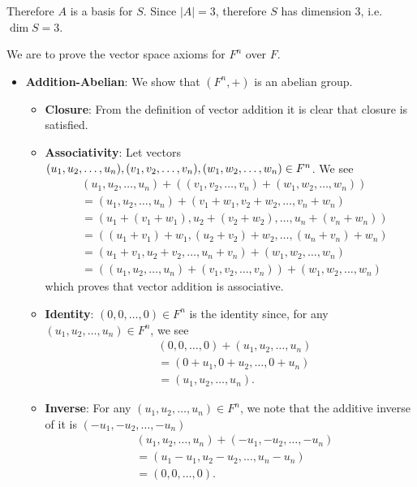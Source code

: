 \begin{questions}
\begin{partquestions}{\alph*}
        Therefore $A$ is a basis for $S$. Since $|A| = 3$, therefore $S$ has dimension 3, i.e. $\dim{S} = 3$.
    \end{partquestions}

    \item We are to prove the vector space axioms for $F^n$ over $F$.
    \begin{itemize}
        \item \textbf{Addition-Abelian}: We show that $(F^n, +)$ is an abelian group.
        \begin{itemize}
            \item \textbf{Closure}: From the definition of vector addition it is clear that closure is satisfied.

            \item \textbf{Associativity}: Let vectors $(u_1, u_2, \dots, u_n), (v_1, v_2, \dots, v_n), \linebreak (w_1, w_2, \dots, w_n) \in F^n$. We see
            \begin{align*}
                &(u_1, u_2, \dots, u_n) + ((v_1, v_2, \dots, v_n) + (w_1, w_2, \dots, w_n))\\
                &= (u_1, u_2, \dots, u_n) + (v_1 + w_1, v_2 + w_2, \dots, v_n + w_n)\\
                &= (u_1 + (v_1 + w_1), u_2 + (v_2 + w_2), \dots, u_n + (v_n + w_n))\\
                &= ((u_1 + v_1) + w_1, (u_2 + v_2) + w_2, \dots, (u_n + v_n) + w_n)\\
                &= (u_1 + v_1, u_2 + v_2, \dots, u_n + v_n) + (w_1, w_2, \dots, w_n)\\
                &= ((u_1, u_2, \dots, u_n) + (v_1, v_2, \dots, v_n)) + (w_1, w_2, \dots, w_n)
            \end{align*}
            which proves that vector addition is associative.

            \item \textbf{Identity}: $(0, 0, \dots, 0) \in F^n$ is the identity since, for any $(u_1, u_2, \dots, u_n) \in F^n$, we see
            \begin{align*}
                &(0, 0, \dots, 0) + (u_1, u_2, \dots, u_n)\\
                &= (0 + u_1, 0 + u_2, \dots, 0 + u_n)\\
                &= (u_1, u_2, \dots, u_n).
            \end{align*}

            \item \textbf{Inverse}: For any $(u_1, u_2, \dots, u_n) \in F^n$, we note that the additive inverse of it is $(-u_1, -u_2, \dots, -u_n)$ 
            \begin{align*}
                &(u_1, u_2, \dots, u_n) + (-u_1, -u_2, \dots, -u_n)\\
                &= (u_1 - u_1, u_2 - u_2, \dots, u_n - u_n)\\
                &= (0, 0, \dots, 0).
            \end{align*}


\end{itemize}
\end{itemize}
\end{questions}
